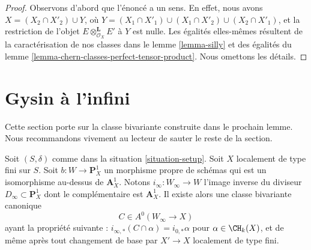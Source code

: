 \begin{proof}
Observons d'abord que l'énoncé a un sens. En effet, nous avons
$X = (X_2 \cap X'_2) \cup Y$, où
$Y = (X_1 \cap X'_1) \cup (X_1 \cap X'_2) \cup (X_2 \cap X'_1)$,
et la restriction de l'objet $E \otimes_{\mathcal{O}_X}^\mathbf{L} E'$
à $Y$ est nulle.
Les égalités elles-mêmes résultent de la caractérisation
de nos classes dans le lemme \ref{lemma-silly}
et des égalités du lemme \ref{lemma-chern-classes-perfect-tensor-product}.
Nous omettons les détails.
\end{proof}







\section{Gysin à l'infini}
\label{section-gysin-at-infty}

\noindent
Cette section porte sur la classe bivariante construite dans le prochain
lemme. Nous recommandons vivement au lecteur de sauter le reste de la section.

\begin{lemma}
\label{lemma-gysin-at-infty}
Soit $(S, \delta)$ comme dans la situation \ref{situation-setup}.
Soit $X$ localement de type fini sur $S$. Soit
$b : W \to \mathbf{P}^1_X$ un morphisme propre de schémas
qui est un isomorphisme au-dessus de $\mathbf{A}^1_X$.
Notons $i_\infty : W_\infty \to W$ l'image inverse du diviseur
$D_\infty \subset \mathbf{P}^1_X$ dont le complémentaire est $\mathbf{A}^1_X$.
Il existe alors une classe bivariante canonique
$$
C \in A^0(W_\infty \to X)
$$
ayant la propriété suivante :
$i_{\infty, *}(C \cap \alpha) = i_{0, *}\alpha$
pour $\alpha \in \CH_k(X)$, et de même après tout changement de base par
$X' \to X$ localement de type fini.
\end{lemma}

